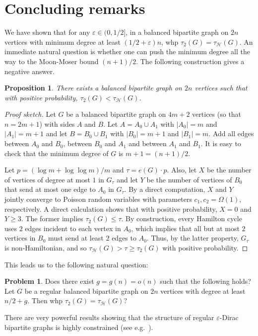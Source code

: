 \documentclass[reqno,final,a4paper]{amsart}
\numberwithin{equation}{section}
\newtheorem{proposition}[theorem]{Proposition}
\theoremstyle{definition}
\newtheorem{problem}[theorem]{Problem}
\theoremstyle{remark}
\newcommand{\eps}{\varepsilon}
\def\calH{\mathcal{H}}
\begin{document}
\section{Concluding remarks}
We have shown that for any $\eps \in (0,1/2]$, in a balanced bipartite graph on $2n$ vertices with minimum degree at least $(1/2 + \eps)n$, whp $\tau_2(G) = \tau_{\calH}(G)$. An immediate natural question is whether one can push the minimum degree all the way to the Moon-Moser bound $(n+1)/2$. The following construction gives a negative answer. 
\begin{proposition}\label{prop:counter-example}
    There exists a balanced bipartite graph on $2n$ vertices such that with positive probability, $\tau_2(G)< \tau_{\calH}(G)$.
\end{proposition}
\begin{proof}[Proof sketch]
    Let $G$ be a balanced bipartite graph on $4m+2$ vertices (so that $n = 2m+1$) with sides $A$ and $B$. Let $A = A_0\cup A_1$ with $|A_0| = m$ and $|A_1| = m+1$ and let $B = B_0\cup B_1$ with $|B_0| = m+1$ and $|B_1| = m$. Add all edges between $A_0$ and $B_0$, between $B_0$ and $A_1$ and between $A_1$ and $B_1$. It is easy to check that the minimum degree of $G$ is $m+1 = (n+1)/2$. 
    
    Let $p = (\log m + \log\log m)/m$ and $\tau = e(G)\cdot p$. 
    Also, let $X$ be the number of vertices of degree at most $1$ in $G_\tau$ and let $Y$ be the number of vertices of $B_0$ that send at most one edge to $A_0$ in $G_\tau$. 
    By a direct computation, $X$ and $Y$ jointly converge to Poisson random variables with parameters $c_1, c_2 =\Omega(1)$, respectively.
    A direct calculation shows that with positive probability, $X = 0$ and $Y\geq 3$. The former implies $\tau_2(G)\leq \tau$. 
    By construction, every Hamilton cycle uses $2$ edges incident to each vertex in $A_0$, which implies that all but at most $2$ vertices in $B_0$ must send at least $2$ edges to $A_0$. Thus, by the latter property, $G_\tau$ is non-Hamiltonian, and so $\tau_{\calH}(G)> \tau \geq \tau_2(G)$ with positive probability.
\end{proof}
This leads us to the following natural question:
\begin{problem}
    Does there exist $g = g(n) = o(n)$ such that the following holds?
    Let $G$ be a regular balanced bipartite graph on $2n$ vertices with degree at least $n/2 + g$. Then whp $\tau_2(G) = \tau_{\calH}(G)$?
\end{problem}
There are very powerful results showing that the structure of regular $\eps$-Dirac bipartite graphs is highly constrained (see e.g.~\cite{Kuhn-Osthus}). 
\end{document}

